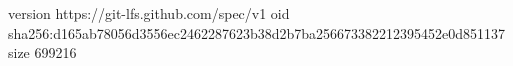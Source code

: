 version https://git-lfs.github.com/spec/v1
oid sha256:d165ab78056d3556ec2462287623b38d2b7ba256673382212395452e0d851137
size 699216
